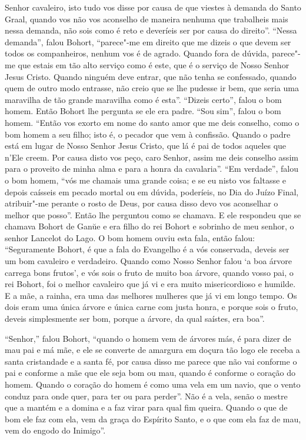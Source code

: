 Senhor cavaleiro, isto tudo vos disse por causa de que viestes à demanda do
Santo Graal, quando vos não vos aconselho de maneira nenhuma que trabalheis
mais nessa demanda, não sois como é reto e deveríeis ser por causa do direito”. 
“Nessa demanda”, falou Bohort, “parece"-me em direito que me
dizeis o que devem ser todos os companheiros, nenhum vos é de agrado. Quando
fora de dúvida, parece"-me que estais em tão alto serviço como é este, que é o
serviço de Nosso Senhor Jesus Cristo. Quando ninguém deve entrar, que não tenha
se confessado, quando quem de outro modo entrasse, não creio que se lhe pudesse
ir bem, que seria uma maravilha de tão grande maravilha como é esta”. “Dizeis
certo”, falou o bom homem. Então Bohort lhe pergunta se ele era padre. “Sou
sim”, falou o bom homem. “Então vos exorto  em nome do santo amor que me deis
conselho, como o bom homem a seu filho; isto é, o pecador que vem à confissão.
Quando o padre está em lugar de Nosso Senhor Jesus Cristo, que lá é pai de
todos aqueles que n’Ele creem. Por causa disto vos peço, caro Senhor, assim me
deis conselho assim para o proveito de minha alma e para a honra da cavalaria”. 
“Em verdade”, falou o bom homem, “vós me chamais uma grande coisa; e
se eu nisto vos faltasse e depois caísseis em pecado mortal ou em dúvida,
poderíeis, no Dia do Juízo Final, atribuir"-me perante o rosto de Deus, por
causa disso devo vos aconselhar o melhor que posso”. Então lhe
perguntou como se chamava. E ele respondeu que se chamava Bohort de Gan\u{u}e e
era filho do rei Bohort e sobrinho de meu senhor,  o senhor Lancelot
do Lago. O bom homem ouviu esta fala,  então falou: “Seguramente Bohort, é que
a fala do Evangelho é a vós conservada, deveis ser um bom cavaleiro e
verdadeiro. Quando como Nosso Senhor falou ‘a boa árvore carrega bons frutos’,
e vós sois o fruto de muito boa árvore, quando vosso pai, o rei Bohort, foi o
melhor cavaleiro que já vi e era muito misericordioso e humilde. E a mãe, a
rainha, era uma das melhores mulheres que já vi em longo tempo. Os dois eram
uma única árvore e única carne com justa honra, e porque sois o fruto, deveis
simplesmente ser bom, porque a árvore, da qual saístes, era boa”. 

“Senhor,” falou Bohort, “quando o homem vem de árvores más, é para dizer de mau
pai e má mãe, e ele se converte de amargura em doçura tão logo ele receba a
santa cristandade e a santa fé, por causa disso me parece que não vai conforme
o pai e conforme a mãe que ele seja bom ou mau, quando é conforme o coração do
homem. Quando o coração do homem é como uma vela em um navio, que o vento
conduz para onde quer, para ter ou para perder”. Não é a vela, senão o mestre
que a mantém e a domina e a faz virar para qual fim queira. Quando o que de bom
ele faz com ela, vem da graça do Espírito Santo, e o que com ela faz de mau,
vem do engodo do Inimigo”. 

